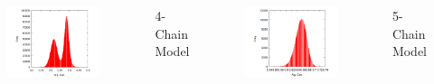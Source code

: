 \documentclass[11pt, dvipdfmx]{beamer}
\begin{document}
\begin{frame}
\begin{columns}[totalwidth=1\textwidth]
\begin{figure}
\includegraphics[width=1.2\columnwidth]{./fig/4_1000_5000.png}
\end{figure}
\vspace{-2mm}
\centering
\small
4-Chain Model
\normalsize

\begin{figure}
\includegraphics[width=1.2\columnwidth]{./fig/5.png}
\end{figure}
\vspace{-2mm}
\centering
\small
5-Chain Model
\normalsize

\end{columns}

\end{frame}
\end{document}
